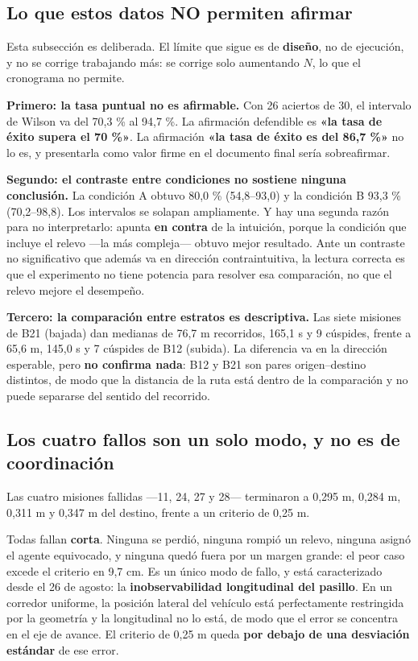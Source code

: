 \documentclass[12pt,letterpaper]{article}
\begin{document}
\subsection{Lo que estos datos NO permiten afirmar}
\label{sec:limites}

Esta subsección es deliberada. El límite que sigue es de \textbf{diseño}, no de ejecución, y no se corrige trabajando más: se corrige solo aumentando $N$, lo que el cronograma no permite.

\textbf{Primero: la tasa puntual no es afirmable.} Con 26 aciertos de 30, el intervalo de Wilson va del 70,3 \% al 94,7 \%. La afirmación defendible es \textbf{«la tasa de éxito supera el 70 \%»}. La afirmación \textbf{«la tasa de éxito es del 86,7 \%»} no lo es, y presentarla como valor firme en el documento final sería sobreafirmar.

\textbf{Segundo: el contraste entre condiciones no sostiene ninguna conclusión.} La condición A obtuvo 80,0 \% (54,8--93,0) y la condición B 93,3 \% (70,2--98,8). Los intervalos se solapan ampliamente. Y hay una segunda razón para no interpretarlo: apunta \textbf{en contra} de la intuición, porque la condición que incluye el relevo ---la más compleja--- obtuvo mejor resultado. Ante un contraste no significativo que además va en dirección contraintuitiva, la lectura correcta es que el experimento no tiene potencia para resolver esa comparación, no que el relevo mejore el desempeño.

\textbf{Tercero: la comparación entre estratos es descriptiva.} Las siete misiones de B21 (bajada) dan medianas de 76,7 m recorridos, 165,1 s y 9 cúspides, frente a 65,6 m, 145,0 s y 7 cúspides de B12 (subida). La diferencia va en la dirección esperable, pero \textbf{no confirma nada}: B12 y B21 son pares origen--destino distintos, de modo que la distancia de la ruta está dentro de la comparación y no puede separarse del sentido del recorrido.

\subsection{Los cuatro fallos son un solo modo, y no es de coordinación}

Las cuatro misiones fallidas ---11, 24, 27 y 28--- terminaron a 0,295 m, 0,284 m, 0,311 m y 0,347 m del destino, frente a un criterio de 0,25 m.

Todas fallan \textbf{corta}. Ninguna se perdió, ninguna rompió un relevo, ninguna asignó el agente equivocado, y ninguna quedó fuera por un margen grande: el peor caso excede el criterio en 9,7 cm. Es un único modo de fallo, y está caracterizado desde el 26 de agosto: la \textbf{inobservabilidad longitudinal del pasillo}. En un corredor uniforme, la posición lateral del vehículo está perfectamente restringida por la geometría y la longitudinal no lo está, de modo que el error se concentra en el eje de avance. El criterio de 0,25 m queda \textbf{por debajo de una desviación estándar} de ese error.
\end{document}
